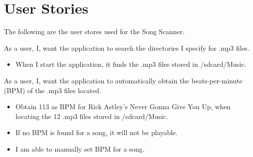 \section{User Stories}
The following are the user stores used for the Song Scanner.

{As a user, I, want the application to search the directories I specify for .mp3 files.}
{\begin{itemize}
\item When I start the application, it finds the .mp3 files stored in /sdcard/Music.
\end{itemize}}

{As a user, I, want the application to automatically obtain the beats-per-minute (BPM) of the .mp3 files located.}
{\begin{itemize}
\item Obtain 113 as BPM for Rick Astley's Never Gonna Give You Up, when locating the 12 .mp3 files stored in /sdcard/Music.
\item If no BPM is found for a song, it will not be playable.
\item I am able to manually set BPM for a song.
\end{itemize}}